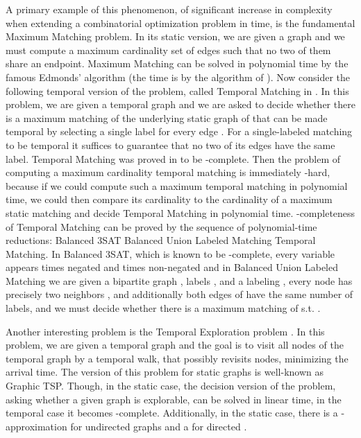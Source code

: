 \documentclass[oribibl, 11pt]{llncs}
\begin{document}
A primary example of this phenomenon, of significant increase in complexity when extending a combinatorial optimization problem in time, is the fundamental {\sc Maximum Matching} problem. In its static version, we are given a graph  and we must compute a maximum cardinality set of edges such that no two of them share an endpoint. {\sc Maximum Matching} can be solved in polynomial time by the famous Edmonds' algorithm \cite{Ed65} (the time is  by the algorithm of \cite{MV80}). Now consider the following temporal version of the problem, called {\sc Temporal Matching} in \cite{MS14}. In this problem, we are given a temporal graph  and we are asked to decide whether there is a maximum matching  of the underlying static graph of  that can be made temporal by selecting a single label  for every edge . For a single-labeled matching to be temporal it suffices to guarantee that no two of its edges have the same label. {\sc Temporal Matching} was proved in \cite{MS14} to be -complete. Then the problem of computing a maximum cardinality temporal matching is immediately -hard, because if we could compute such a maximum temporal matching in polynomial time, we could then compare its cardinality to the cardinality of a maximum static matching and decide {\sc Temporal Matching} in polynomial time. -completeness of {\sc Temporal Matching} can be proved by the sequence of polynomial-time reductions: {\sc Balanced 3SAT}  {\sc Balanced Union Labeled Matching}  {\sc Temporal Matching}. In {\sc Balanced 3SAT}, which is known to be -complete, every variable  appears  times negated and  times non-negated and in {\sc Balanced Union Labeled Matching} we are given a bipartite graph , labels , and a labeling , every node  has precisely two neighbors , and additionally both edges of  have the same number of labels, and we must decide whether there is a maximum matching  of  s.t.  \cite{MS14}.

Another interesting problem is the {\sc Temporal Exploration} problem \cite{MS14}. In this problem, we are given a temporal graph and the goal is to visit all nodes of the temporal graph by a temporal walk, that possibly revisits nodes, minimizing the arrival time. The version of this problem for static graphs is well-known as {\sc Graphic TSP}. Though, in the static case, the decision version of the problem, asking whether a given graph is explorable, can be solved in linear time, in the temporal case it becomes -complete. Additionally, in the static case, there is a -approximation for undirected graphs \cite{GSS11} and a  for directed \cite{AGMGS10}. 
\end{document}
